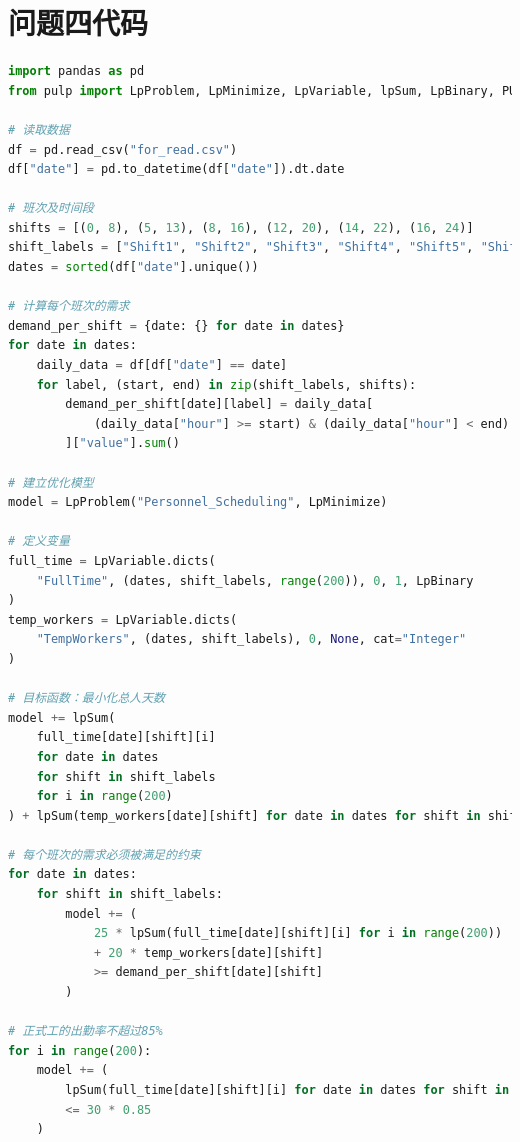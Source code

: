 \documentclass[UTF8,a4paper,10 pt]{article}%
\begin{document}
\section{问题四代码}
\begin{lstlisting}[language=python]
import pandas as pd
from pulp import LpProblem, LpMinimize, LpVariable, lpSum, LpBinary, PULP_CBC_CMD

# 读取数据
df = pd.read_csv("for_read.csv")
df["date"] = pd.to_datetime(df["date"]).dt.date

# 班次及时间段
shifts = [(0, 8), (5, 13), (8, 16), (12, 20), (14, 22), (16, 24)]
shift_labels = ["Shift1", "Shift2", "Shift3", "Shift4", "Shift5", "Shift6"]
dates = sorted(df["date"].unique())

# 计算每个班次的需求
demand_per_shift = {date: {} for date in dates}
for date in dates:
    daily_data = df[df["date"] == date]
    for label, (start, end) in zip(shift_labels, shifts):
        demand_per_shift[date][label] = daily_data[
            (daily_data["hour"] >= start) & (daily_data["hour"] < end)
        ]["value"].sum()

# 建立优化模型
model = LpProblem("Personnel_Scheduling", LpMinimize)

# 定义变量
full_time = LpVariable.dicts(
    "FullTime", (dates, shift_labels, range(200)), 0, 1, LpBinary
)
temp_workers = LpVariable.dicts(
    "TempWorkers", (dates, shift_labels), 0, None, cat="Integer"
)

# 目标函数：最小化总人天数
model += lpSum(
    full_time[date][shift][i]
    for date in dates
    for shift in shift_labels
    for i in range(200)
) + lpSum(temp_workers[date][shift] for date in dates for shift in shift_labels)

# 每个班次的需求必须被满足的约束
for date in dates:
    for shift in shift_labels:
        model += (
            25 * lpSum(full_time[date][shift][i] for i in range(200))
            + 20 * temp_workers[date][shift]
            >= demand_per_shift[date][shift]
        )

# 正式工的出勤率不超过85%
for i in range(200):
    model += (
        lpSum(full_time[date][shift][i] for date in dates for shift in shift_labels)
        <= 30 * 0.85
    )


\end{lstlisting}
\end{document}
